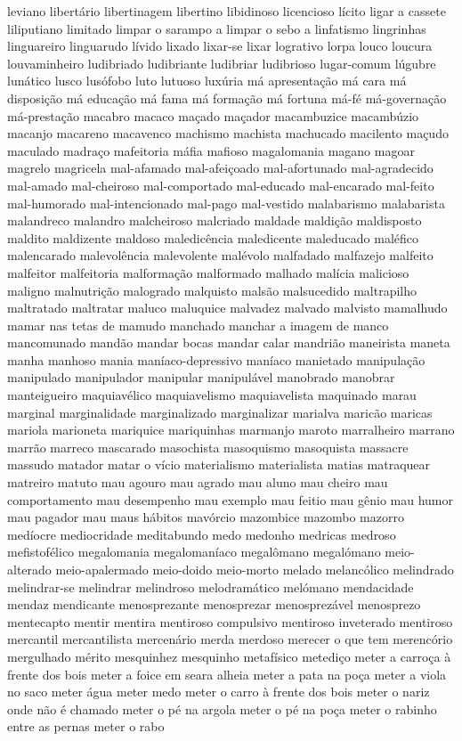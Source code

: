 \begin{appendices}
leviano libert\'{a}rio libertinagem libertino libidinoso licencioso l\'{i}cito ligar a cassete liliputiano limitado limpar o sarampo a limpar o sebo a linfatismo lingrinhas linguareiro linguarudo l\'{i}vido lixado lixar-se lixar logrativo lorpa louco loucura louvaminheiro ludibriado ludibriante ludibriar ludibrioso lugar-comum l\'{u}gubre lun\'{a}tico lusco lus\'{o}fobo luto lutuoso lux\'{u}ria m\'{a} apresenta\c{c}\~ao m\'{a} cara m\'{a} disposi\c{c}\~ao m\'{a} educa\c{c}\~ao m\'{a} fama m\'{a} forma\c{c}\~ao m\'{a} fortuna m\'{a}-f\'{e} m\'{a}-governa\c{c}\~ao m\'{a}-presta\c{c}\~ao macabro macaco ma\c{c}ado ma\c{c}ador macambuzice macamb\'{u}zio macanjo macareno macavenco machismo machista machucado macilento ma\c{c}udo maculado madra\c{c}o mafeitoria m\'{a}fia mafioso magalomania magano magoar magrelo magricela mal-afamado mal-afei\c{c}oado mal-afortunado mal-agradecido mal-amado mal-cheiroso mal-comportado mal-educado mal-encarado mal-feito mal-humorado mal-intencionado mal-pago mal-vestido malabarismo malabarista malandreco malandro malcheiroso malcriado maldade maldi\c{c}\~ao maldisposto maldito maldizente maldoso maledic\^{e}ncia maledicente maleducado mal\'{e}fico malencarado malevol\^{e}ncia malevolente mal\'{e}volo malfadado malfazejo malfeito malfeitor malfeitoria malforma\c{c}\~ao malformado malhado mal\'{i}cia malicioso maligno malnutri\c{c}\~ao malogrado malquisto mals\~ao malsucedido maltrapilho maltratado maltratar maluco maluquice malvadez malvado malvisto mamalhudo mamar nas tetas de mamudo manchado manchar a imagem de manco mancomunado mand\~ao mandar bocas mandar calar mandri\~ao maneirista maneta manha manhoso mania man\'{i}aco-depressivo man\'{i}aco manietado manipula\c{c}\~ao manipulado manipulador manipular manipul\'{a}vel manobrado manobrar manteigueiro maquiav\'{e}lico maquiavelismo maquiavelista maquinado marau marginal marginalidade marginalizado marginalizar marialva maric\~ao maricas mariola marioneta mariquice mariquinhas marmanjo maroto marralheiro marrano marr\~ao marreco mascarado masochista masoquismo masoquista massacre massudo matador matar o v\'{i}cio materialismo materialista matias matraquear matreiro matuto mau agouro mau agrado mau aluno mau cheiro mau comportamento mau desempenho mau exemplo mau feitio mau g\^{e}nio mau humor mau pagador mau maus h\'{a}bitos mav\'{o}rcio mazombice mazombo mazorro med\'{i}ocre mediocridade meditabundo medo medonho medricas medroso mefistof\'{e}lico megalomania megaloman\'{i}aco megal\^{o}mano megal\'{o}mano meio-alterado meio-apalermado meio-doido meio-morto melado melanc\'{o}lico melindrado melindrar-se melindrar melindroso melodram\'{a}tico mel\'{o}mano mendacidade mendaz mendicante menosprezante menosprezar menosprez\'{a}vel menosprezo mentecapto mentir mentira mentiroso compulsivo mentiroso inveterado mentiroso mercantil mercantilista mercen\'{a}rio merda merdoso merecer o que tem merenc\'{o}rio mergulhado m\'{e}rito mesquinhez mesquinho metaf\'{i}sico metedi\c{c}o meter a carro\c{c}a \`{a} frente dos bois meter a foice em seara alheia meter a pata na po\c{c}a meter a viola no saco meter \'{a}gua meter medo meter o carro \`{a} frente dos bois meter o nariz onde n\~ao \'{e} chamado meter o p\'{e} na argola meter o p\'{e} na po\c{c}a meter o rabinho entre as pernas meter o rabo 
\end{appendices}
